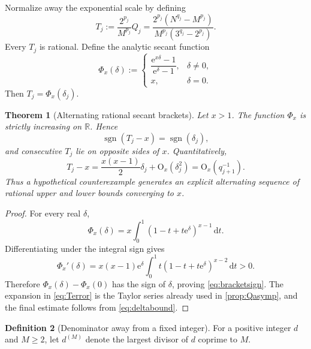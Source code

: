 \documentclass[11pt,oneside]{article}
\newtheorem{theorem}{Theorem}[section]
\theoremstyle{definition}
\newtheorem{definition}[theorem]{Definition}
\theoremstyle{remark}
\newcommand{\R}{\mathbb R}
\newcommand{\sgn}{\operatorname{sgn}}
\newcommand{\e}{\mathrm e}
\newcommand{\dd}{\,\mathrm d}
\newcommand{\bigO}{\mathrm O}
\begin{document}
Normalize away the exponential scale by defining
\begin{equation}
 T_j:=\frac{2^{p_j}}{M^{p_j}}Q_j
 =\frac{2^{p_j}(N^{q_j}-M^{p_j})}
 {M^{p_j}(3^{q_j}-2^{p_j})}.
 \label{eq:Tj}
\end{equation}
Every $T_j$ is rational.  Define the analytic secant function
\begin{equation}
 \Phi_x(\delta):=
 \begin{cases}
 \dfrac{\e^{x\delta}-1}{\e^\delta-1},&\delta\ne0,\\[0.8em]
 x,&\delta=0.
 \end{cases}
 \label{eq:Phi}
\end{equation}
Then $T_j=\Phi_x(\delta_j)$.

\begin{theorem}[Alternating rational secant brackets]
\label{thm:brackets}
Let $x>1$.  The function $\Phi_x$ is strictly increasing on $\R$.  Hence
\begin{equation}
  \sgn(T_j-x)=\sgn(\delta_j),
  \label{eq:bracketsign}
\end{equation}
and consecutive $T_j$ lie on opposite sides of $x$.  Quantitatively,
\begin{equation}
  T_j-x=\frac{x(x-1)}2\delta_j+\bigO_x(\delta_j^2)
  =\bigO_x(q_{j+1}^{-1}).
  \label{eq:Terror}
\end{equation}
Thus a hypothetical counterexample generates an explicit alternating sequence
of rational upper and lower bounds converging to $x$.
\end{theorem}

\begin{proof}
For every real $\delta$,
\begin{equation}
 \Phi_x(\delta)
 =x\int_0^1(1-t+t\e^\delta)^{x-1}\dd t.
 \label{eq:Phiintegral}
\end{equation}
Differentiating under the integral sign gives
\[
 \Phi_x'(\delta)
 =x(x-1)\e^\delta
 \int_0^1t(1-t+t\e^\delta)^{x-2}\dd t>0.
\]
Therefore $\Phi_x(\delta)-\Phi_x(0)$ has the sign of $\delta$, proving
\eqref{eq:bracketsign}.  The expansion in \eqref{eq:Terror} is the Taylor
series already used in \cref{prop:Qasymp}, and the final estimate follows from
\eqref{eq:deltabound}.
\end{proof}

\begin{definition}[Denominator away from a fixed integer]
For a positive integer $d$ and $M\ge2$, let $d^{(M)}$ denote the largest
divisor of $d$ coprime to $M$.
\end{definition}
\end{document}
